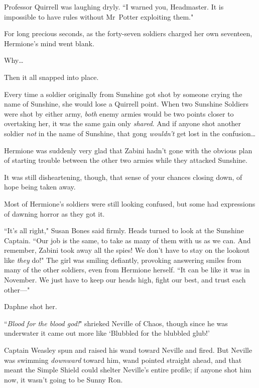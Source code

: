Professor Quirrell was laughing dryly. ``I warned you, Headmaster. It is impossible to have rules without Mr~Potter exploiting them."

\later

For long precious seconds, as the forty-seven soldiers charged her own seventeen, Hermione's mind went blank.

Why{\ldots}

Then it all snapped into place.

Every time a soldier originally from Sunshine got shot by someone crying the name of Sunshine, she would lose a Quirrell point. When two Sunshine Soldiers were shot by either army, \emph{both} enemy armies would be two points closer to overtaking her, it was the same gain only \emph{shared}. And if anyone shot another soldier \emph{not} in the name of Sunshine, that gong \emph{wouldn't} get lost in the confusion{\ldots}

Hermione was suddenly very glad that Zabini hadn't gone with the obvious plan of starting trouble between the other two armies while they attacked Sunshine.

It was still disheartening, though, that sense of your chances closing down, of hope being taken away.

Most of Hermione's soldiers were still looking confused, but some had expressions of dawning horror as they got it.

``It's all right," Susan Bones said firmly. Heads turned to look at the Sunshine Captain. ``Our job is the same, to take as many of them with us as we can. And remember, Zabini took away all the spies! We don't have to stay on the lookout like \emph{they} do!" The girl was smiling defiantly, provoking answering smiles from many of the other soldiers, even from Hermione herself. ``It can be like it was in November. We just have to keep our heads high, fight our best, and trust each other—"

Daphne shot her.

\later

``\emph{Blood for the blood god!}" shrieked Neville of Chaos, though since he was underwater it came out more like `Blubbled for the blubbled glub!'

Captain Weasley spun and raised his wand toward Neville and fired. But Neville was swimming \emph{downward} toward him, wand pointed straight ahead, and that meant the Simple Shield could shelter Neville's entire profile; if anyone shot him now, it wasn't going to be Sunny Ron.

